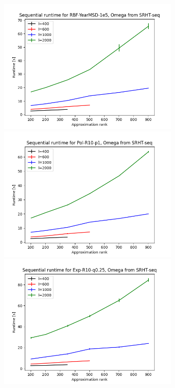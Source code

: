 \documentclass{article}
\theoremstyle{definition}
\begin{document}
\begin{figure}
\begin{subfigure}[t]{\textwidth+20pt\relax}
    \includegraphics[width=\dimexpr\linewidth-20pt\relax]{plots/runtime_new/runtime_RBF-YearMSD-1e5_SRHT-seq.png}
    \includegraphics[width=\dimexpr\linewidth-20pt\relax]{plots/runtime_new/runtime_Pol-R10-p1_SRHT-seq.png}
    \includegraphics[width=\dimexpr\linewidth-20pt\relax]{plots/runtime_new/runtime_Exp-R10-q0.25_SRHT-seq.png}

\end{subfigure}
\end{figure}
\end{document}
